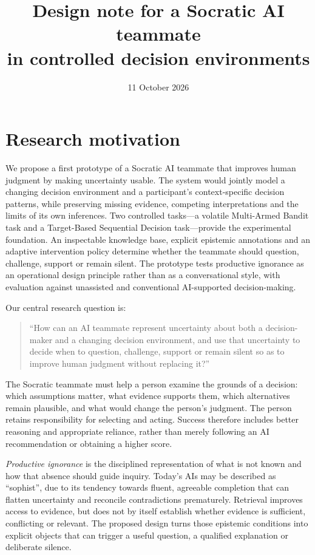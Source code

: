 \documentclass[11pt,a4paper]{article}
\title{\textbf{Design note for a Socratic AI teammate\\in controlled decision environments}}
\author{}
\date{11 October 2026}
\begin{document}
\maketitle
\vspace{-2em}

\section{Research motivation}
We propose a first prototype of a Socratic AI teammate that improves human judgment by making uncertainty usable. The system would jointly model a changing decision environment and a participant's context-specific decision patterns, while preserving missing evidence, competing interpretations and the limits of its own inferences. Two controlled tasks---a volatile Multi-Armed Bandit task and a Target-Based Sequential Decision task---provide the experimental foundation. An inspectable knowledge base, explicit epistemic annotations and an adaptive intervention policy determine whether the teammate should question, challenge, support or remain silent. The prototype tests productive ignorance as an operational design principle rather than as a conversational style, with evaluation against unassisted and conventional AI-supported decision-making.

Our central research question is:
\begin{quote}
``How can an AI teammate represent uncertainty about both a decision-maker and a changing decision environment, and use that uncertainty to decide when to question, challenge, support or remain silent so as to improve human judgment without replacing it?''
\end{quote}

The Socratic teammate must help a person examine the grounds of a decision: which assumptions matter, what evidence supports them, which alternatives remain plausible, and what would change the person's judgment. The person retains responsibility for selecting and acting. Success therefore includes better reasoning and appropriate reliance, rather than merely following an AI recommendation or obtaining a higher score.

\emph{Productive ignorance} is the disciplined representation of what is not known and how that absence should guide inquiry. Today's AIs may be described as ``sophist'', due to its tendency towards fluent, agreeable completion that can flatten uncertainty and reconcile contradictions prematurely. Retrieval improves access to evidence, but does not by itself establish whether evidence is sufficient, conflicting or relevant. The proposed design turns those epistemic conditions into explicit objects that can trigger a useful question, a qualified explanation or deliberate silence.
\end{document}
